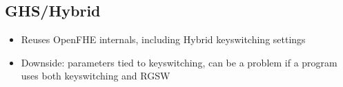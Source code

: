 \subsection{GHS/Hybrid}
\begin{itemize}
    \item Reuses OpenFHE internals, including Hybrid keyswitching settings
    \item Downside: parameters tied to keyswitching, can be a problem if a program uses both keyswitching and RGSW
\end{itemize}

